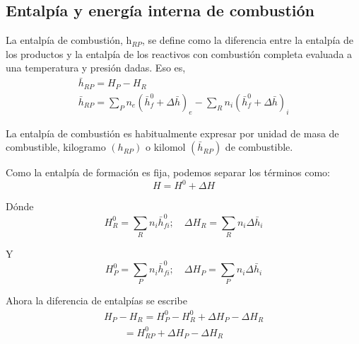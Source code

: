 \subsection{Entalpía y energía interna de combustión}
\par La entalpía de combustión, h$_{RP}$, se define como la diferencia entre la entalpía de los productos y la entalpía de los reactivos con combustión completa evaluada a una temperatura y presión dadas. Eso es,
\begin{equation}
\begin{gathered}
\bar h_{RP} = H_P - H_R \\
\bar h_{RP} = \sum_P n_e(\bar h^0_f + \Delta \bar h)_e - \sum_R n_i(\bar h^0_f + \Delta \bar h)_i
\end{gathered}
\end{equation}
\par La entalpía de combustión es habitualmente expresar por unidad de masa de combustible, kilogramo $(h_{RP})$ o kilomol $(\bar h_{RP})$ de combustible.
\par Como la entalpía de formación es fija, podemos separar los términos como:
\begin{equation}
    H = H^0 + \Delta H
\end{equation}
\par Dónde
\begin{equation}
    H^0_{R} = \sum_R n_i \bar h^0_{fi} ; \quad \Delta H_{R} = \sum_R n_i \Delta \bar h_{i}
\end{equation}
\par Y
\begin{equation}
    H^0_{P} = \sum_P n_i \bar h^0_{fi} ; \quad \Delta H_{P} = \sum_P n_i \Delta \bar h_{i}
\end{equation}
\par Ahora la diferencia de entalpías se escribe
\begin{equation}
\begin{gathered}
    H_P - H_R = H^0_P - H^0_R + \Delta H_P - \Delta H_R \\
    \quad \quad = H^0_{RP} + \Delta H_P - \Delta H_R
\end{gathered}
\end{equation}

